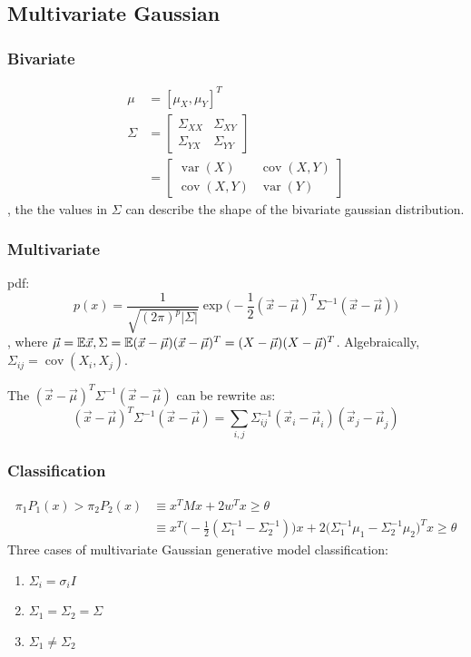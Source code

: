 \documentclass[a4paper]{report}
\begin{document}
\subsection{Multivariate Gaussian}
\subsubsection{Bivariate}
\begin{align*}
\mu &= [\mu_X, \mu_Y]^T \\
\Sigma &= \begin{bmatrix}
\Sigma_{XX} & \Sigma_{XY} \\
\Sigma_{YX} & \Sigma_{YY} 
\end{bmatrix}\\
&= \begin{bmatrix}
\operatorname{var}(X) & \operatorname{cov}(X,Y) \\
\operatorname{cov}(X,Y) & \operatorname{var}(Y)
\end{bmatrix}
\end{align*}
, the the values in $\Sigma$ can describe the shape of the bivariate gaussian distribution.


\subsubsection{Multivariate}
pdf:
$$
p(x) = \frac{1}{\sqrt{(2\pi)^p|\Sigma|}}\exp\Big(-\frac{1}{2}(\vec x-\vec\mu)^T\Sigma^{-1}(\vec x-\vec\mu)\Big)
$$
, where $\vec\mu=\mathbb{E} \vec x, \Sigma=\mathbb{E}(\vec x-\vec\mu)(\vec x-\vec\mu)^T=(X-\vec\mu)(X-\vec\mu)^T$. Algebraically, $\Sigma_{ij}=\operatorname{cov}(X_i, X_j)$. 

The $(\vec x-\vec\mu)^T\Sigma^{-1}(\vec x-\vec\mu)$ can be rewrite as: 
$$
(\vec x-\vec\mu)^T\Sigma^{-1}(\vec x-\vec\mu) = \sum_{i, j} \Sigma^{-1}_{ij} (\vec x_i-\vec \mu_i)(\vec x_j-\vec \mu_j)
$$

\subsubsection{Classification}
\begin{align*}
\pi_1 P_1(x) > \pi_2 P_2(x) &\equiv x^T Mx+2w^Tx \geq \theta \\
&\equiv x^T\Big(-\frac{1}{2}(\Sigma_1^{-1}-\Sigma_2^{-1})\Big)x+2\Big(\Sigma_1^{-1}\mu_1-\Sigma_2^{-1}\mu_2\Big)^Tx \geq \theta
\end{align*}
Three cases of multivariate Gaussian generative model classification: 
\begin{enumerate}
\item $\Sigma_i = \sigma_i I$
\item $\Sigma_1=\Sigma_2=\Sigma$
\item $\Sigma_1 \neq \Sigma_2$
\end{enumerate}
\end{document}
